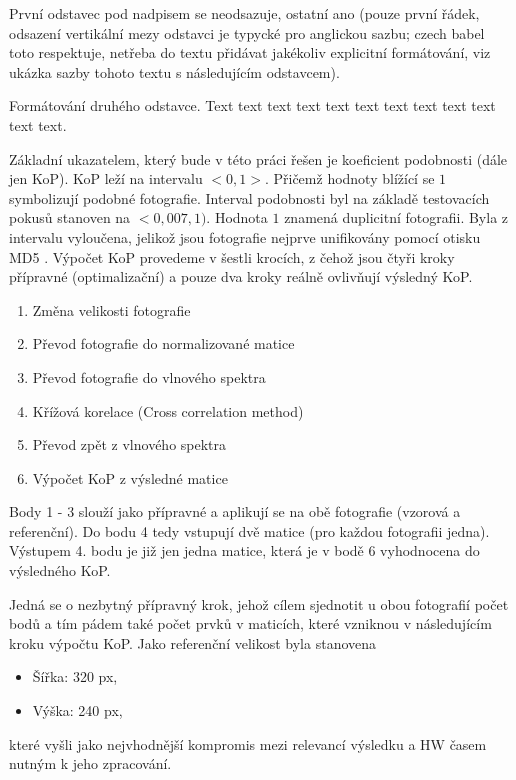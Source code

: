 
První odstavec pod nadpisem se neodsazuje, ostatní ano (pouze první řádek, odsazení vertikální mezy odstavci je typycké pro anglickou sazbu; czech babel toto respektuje, netřeba do textu přidávat jakékoliv explicitní formátování, viz ukázka sazby tohoto textu s následujícím odstavcem).

Formátování druhého odstavce. Text text text text text text text text text text text text.



Základní ukazatelem, který bude v této práci řešen je koeficient podobnosti (dále jen KoP). KoP leží na intervalu $ <0,1> $. Přičemž hodnoty blížící se $ 1 $ symbolizují podobné fotografie. Interval podobnosti byl na základě testovacích pokusů stanoven na $ <0,007, 1) $. Hodnota $ 1 $ znamená duplicitní fotografii. Byla z intervalu vyloučena, jelikož jsou fotografie nejprve unifikovány pomocí otisku MD5 \cite{md5}.
Výpočet KoP provedeme v šestli krocích, z čehož jsou čtyři kroky přípravné (optimalizační) a pouze dva kroky reálně ovlivňují výsledný KoP.
\begin{enumerate}
	\setlength{\parskip}{0pt}
	\setlength{\itemsep}{0pt}
	\item {Změna velikosti fotografie}
	\item {Převod fotografie do normalizované matice}
	\item {Převod fotografie do vlnového spektra}
	\item {Křížová korelace (Cross correlation method)}
	\item {Převod zpět z vlnového spektra}
	\item {Výpočet KoP z výsledné matice}
\end{enumerate}
Body 1 - 3 slouží jako přípravné a aplikují se na obě fotografie (vzorová a referenční). Do bodu 4 tedy vstupují dvě matice (pro každou fotografii jedna). Výstupem 4. bodu je již jen jedna matice, která je v bodě 6 vyhodnocena do výsledného KoP.

Jedná se o nezbytný přípravný krok, jehož cílem sjednotit u obou fotografií počet bodů a tím pádem také počet prvků v maticích, které vzniknou v následujícím kroku výpočtu KoP.
Jako referenční velikost byla stanovena
\begin{itemize}
	\setlength{\parskip}{0pt}
	\setlength{\itemsep}{0pt}
	\item Šířka: 320 px,
	\item Výška: 240 px,
\end{itemize}
které vyšli jako nejvhodnější kompromis mezi relevancí výsledku a HW časem nutným k jeho zpracování.

